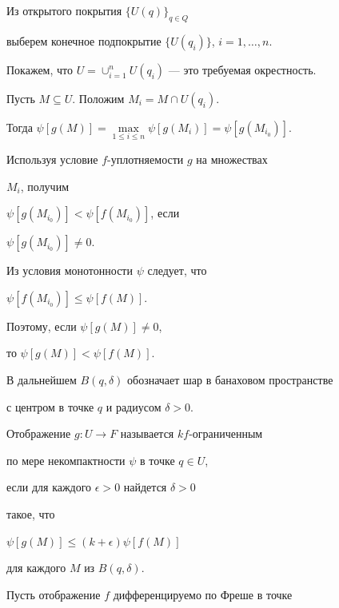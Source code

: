 \begin{pf}


Из открытого покрытия $\{U(q) \}_{q\in Q}$


выберем конечное подпокрытие $\{U(q_i) \}$, $i = 1,\dotsc, n$.


Покажем, что $U = \cup_{i=1}^n U(q_i) $ --- это требуемая окрестность.


Пусть $M \subseteq U$. Положим $M_i = M \cap U(q_i)$.


Тогда $\psi [g(M)] = \max\limits_{1\leq i\leq n} \psi [g(M_ i)] = 


\psi [g(M_{i_0})]$.


Используя условие $f$-уплотняемости $g$ на множествах 


$M_i$, получим 


$\psi [g(M_{i_0})] < \psi [f(M_{i_0})]$, если


$\psi [g(M_{i_0})] \ne 0$.


Из условия монотонности $\psi$ следует, что 


$\psi [f(M_{i_0})] \leq \psi [f(M)]$.


Поэтому, если $ \psi [g(M)] \ne 0$,


то $ \psi [g(M)] < \psi [f(M)] $.


\end{pf}





В дальнейшем $B(q,\delta)$ обозначает шар в банаховом пространстве


с центром в точке $q$ и радиусом $\delta > 0$.





\begin{defns}


Отображение $g:U \to F$ называется $k f$-ограниченным


по мере некомпактности $\psi$ в точке $q\in U$,


если для каждого $\epsilon > 0$ найдется $\delta > 0$


такое, что


$\psi [g(M)] \leq (k+\epsilon) \psi [f(M)]$


для каждого $M$ из $B(q,\delta)$.


\end{defns}





Пусть отображение $f$ дифференцируемо по Фреше в точке


